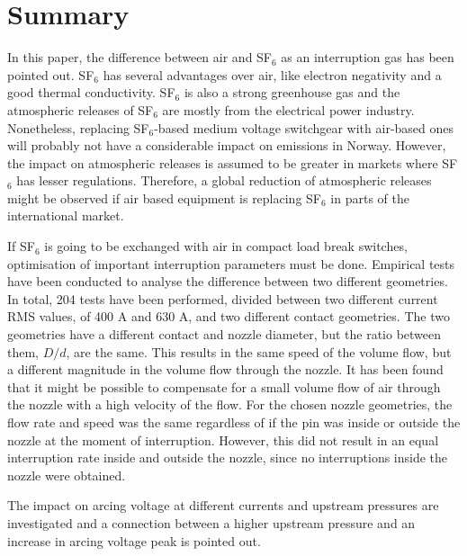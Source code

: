 \documentclass[10pt,a4paper,twoside]{article}
\begin{document}
\thispagestyle{empty}
\cleardoublepage

\section*{Summary}
\setcounter{page}{1}

In this paper, the difference between air and SF$_6$ as an interruption gas has been pointed out. SF$_6$ has several advantages over air, like electron negativity and a good thermal conductivity. SF$_6$ is also a strong greenhouse gas and the atmospheric releases of SF$_6$ are mostly from the electrical power industry. Nonetheless, replacing SF$_6$-based medium voltage switchgear with air-based ones will probably not have a considerable impact on emissions in Norway. However, the impact on atmospheric releases is assumed to be greater in markets where SF$_6$ has lesser regulations. Therefore, a global reduction of atmospheric releases might be observed if air based equipment is replacing SF$_6$ in parts of the international market.  

If SF$_6$ is going to be exchanged with air in compact load break switches, optimisation of important interruption parameters must be done. Empirical tests have been conducted to analyse the difference between two different geometries. In total, 204 tests have been performed, divided between two different current RMS values, of 400 A and 630 A, and two different contact geometries. The two geometries have a different contact and nozzle diameter, but the ratio between them, $D/d$, are the same. This results in the same speed of the volume flow, but a different magnitude in the volume flow through the nozzle. It has been found that it might be possible to compensate for a small volume flow of air through the nozzle with a high velocity of the flow. For the chosen nozzle geometries, the flow rate and speed was the same regardless of if the pin was inside or outside the nozzle at the moment of interruption. However, this did not result in an equal interruption rate inside and outside the nozzle, since no interruptions inside the nozzle were obtained.

The impact on arcing voltage at different currents and upstream pressures are investigated and a connection between a higher upstream pressure and an increase in arcing voltage peak is pointed out.
\end{document}
